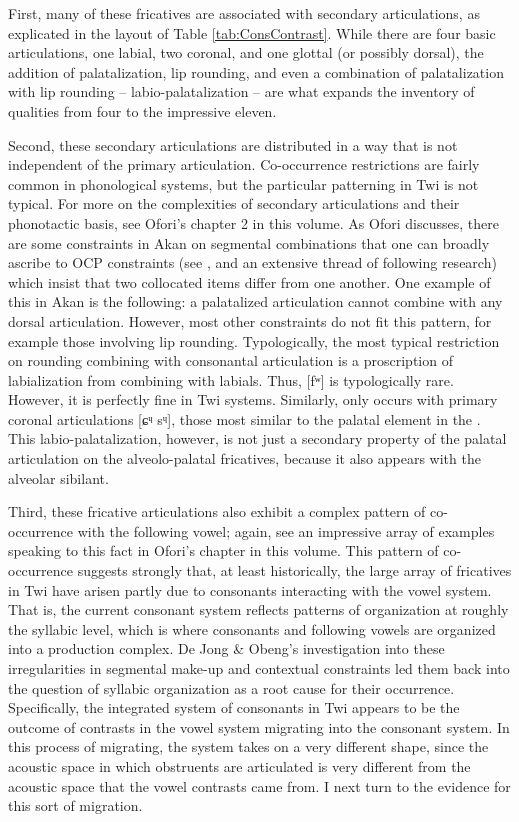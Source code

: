 \documentclass[output=paper,colorlinks,citecolor=brown]{langscibook}
\begin{document}
First, many of these fricatives are associated with secondary articulations, as explicated in the layout of Table \ref{tab:ConsContrast}. While there are four basic articulations, one labial, two coronal, and one glottal (or possibly dorsal), the addition of palatalization, lip rounding, and even a combination of palatalization with lip rounding -- labio-palatalization -- are what expands the inventory of qualities from four to the impressive eleven. 

Second, these secondary articulations are distributed in a way that is not independent of the primary articulation. Co-occurrence  restrictions are fairly common in phonological systems, but the particular patterning in Twi is not typical. For more on the complexities of secondary articulations and their phonotactic basis, see Ofori's chapter 2 in this volume. As Ofori discusses, there are some constraints in Akan on segmental combinations that one can broadly ascribe to OCP  constraints (see \citealt{Leben1973}, and an extensive thread of following research) which insist that two collocated items differ from one another. One example of this in Akan is the following: a palatalized articulation cannot combine with any dorsal articulation. However, most other constraints do not fit this pattern, for example those involving lip rounding. Typologically, the most typical restriction on rounding combining with consonantal articulation is a proscription of labialization from combining with labials. Thus, [fʷ] is typologically rare. However, it is perfectly fine in Twi systems. Similarly,  only occurs with primary coronal articulations [ɕᶣ sᶣ], those most similar to the palatal element in the . This labio-palatalization, however, is not just a secondary property of the palatal articulation on the alveolo-palatal fricatives, because it also appears with the alveolar sibilant.

Third, these fricative articulations also exhibit a complex pattern of co-occur\-rence with the following vowel; again, see an impressive array of examples speaking to this fact in Ofori's chapter in this volume. This pattern of co-occurrence suggests strongly that, at least historically, the large array of fricatives in Twi have arisen partly due to consonants interacting with the vowel system. That is, the current consonant system reflects patterns of organization at roughly the syllabic level, which is where consonants and following vowels are organized into a production complex. De Jong \& Obeng's \citeyearpar{deJongObeng2000} investigation into these irregularities in segmental make-up and contextual constraints led them back into the question of syllabic organization as a root cause for their occurrence. Specifically, the integrated system of consonants in Twi appears to be the outcome of contrasts in the vowel system migrating into the consonant system. In this process of migrating, the system takes on a very different shape, since the acoustic space in which obstruents are articulated is very different from the acoustic space that the vowel contrasts came from. I next turn to the evidence for this sort of migration. 
\end{document}
